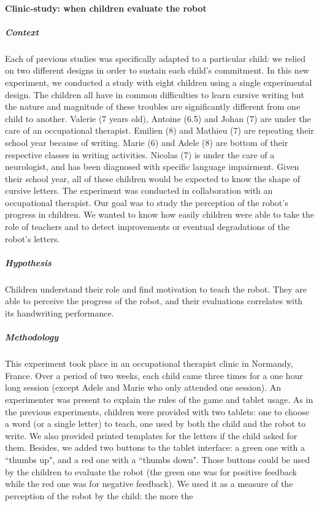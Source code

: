 \documentclass[10pt,a4paper]{article}
\begin{document}
\paragraph{Clinic-study: when children evaluate the robot}
\subparagraph{Context}
Each of previous studies was specifically adapted to a particular child: we relied on two different
designs in order to sustain each child's commitment.
In this new experiment, we conducted a study with eight children using a single experimental design. The children all have in common difficulties to learn
cursive writing but the nature and magnitude of these troubles are significantly
different from one child to another. Valerie (7 years old), Antoine (6.5) and
Johan (7) are under the care of an
occupational therapist. Emilien (8) and Mathieu (7) are repeating their school year
because of writing. Marie (6) and Adele (8) are bottom of their respective
classes in writing activities. Nicolas (7) is under the care of a neurologist, and
has been diagnosed with specific language impairment. Given their school year, all of these children would be
expected to know the shape of
cursive letters. The experiment was conducted in collaboration with an occupational therapist. Our goal was to study the perception of the robot's progress in children. We wanted to know how easily children were able to take the role of teachers and to detect improvements or eventual degradations of the robot's letters.
\subparagraph{Hypothesis}
Children understand their role and find motivation to teach the robot. They are able to perceive the progress of the robot, and their evaluations correlates with its handwriting performance.
\subparagraph{Methodology}
This experiment took place in an occupational therapist clinic
in Normandy, France. Over a period of two weeks, each child came three times for a one hour long
session (except Adele and Marie who only attended one session). An experimenter was present to explain the rules of the game and tablet usage. As in the previous experiments, children were provided with two tablets: one to choose a word (or a single letter) to teach, one
used by both the child and the robot to write. We also provided printed templates for the letters if the child asked for them. 
Besides, we added two buttons to the tablet interface: a green one with a ``thumbs up", and
a red one with a ``thumbs down". Those buttons could be used by the children to evaluate the
robot (the green one was for positive feedback while the red one was for negative feedback). 
We used it as a measure of the perception of the robot by the child: the more the
\end{document}
